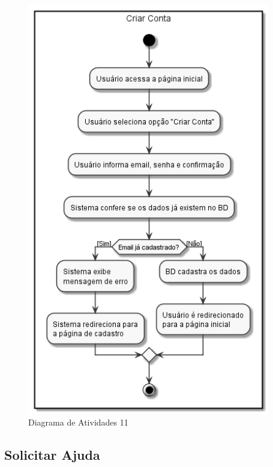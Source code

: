 \documentclass[rascunho,xindy,acronym,symbols]{fei}
\begin{document}
\begin{figure}[H]
    \centering
    \includegraphics[scale=0.6, width=300pt]{./Images/Criar_Conta.png}
    \caption{Diagrama de Atividades 11}
    \label{fig:diag_atv11}
\end{figure}

\subsection{Solicitar Ajuda}
\end{document}
